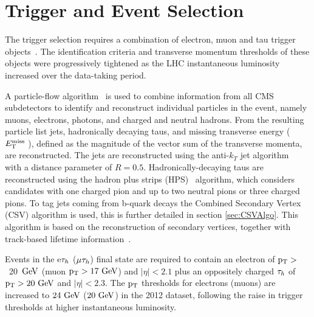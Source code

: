  

\section{Trigger and Event Selection}


The trigger selection requires a combination of electron, muon and tau trigger 
objects~\cite{CMS-PAS-EGM-10-004,CMS-PAS-MUO-10-002,CMS-EWK-TAU}. 
The identification criteria and transverse momentum thresholds of these objects 
were progressively tightened as the LHC instantaneous luminosity increased over the data-taking period.

A particle-flow algorithm~\cite{CMS-PAS-PFT-09-001,CMS-PAS-PFT-10-002,CMS-PAS-PFT-10-003} 
is used to combine information from all CMS subdetectors to identify and reconstruct individual 
particles in the event, namely muons, electrons, photons, and charged and neutral hadrons. 
From the resulting particle list jets, hadronically decaying taus, and missing transverse energy 
($E_\mathrm{T}^{\mathrm{miss}}\;$), defined as the magnitude of the vector sum of the transverse momenta, are reconstructed. 
The jets are reconstructed using the anti-$k_T$ jet algorithm~\cite{Cacciari:fastjet1,Cacciari:fastjet2} 
with a distance parameter of $R=0.5$. Hadronically-decaying taus are reconstructed using the hadron 
plus strips (HPS)~\cite{CMS-PAS-TAU-11-001} algorithm, which considers candidates with one charged 
pion and up to two neutral pions or three charged pions. To tag jets coming from b-quark decays the 
Combined Secondary Vertex (CSV) algorithm is used, this is further detailed in section \ref{sec:CSVAlgo}. 
This algorithm is based on the reconstruction of secondary vertices, together with track-based lifetime 
information~\cite{BTV-11-004}. 

Events in the $\mathrm{e}\mathrm{\tau}_h$ ($\mathrm{\mu}\mathrm{\tau}_h$) final state are required to contain
an electron of $\mathrm{p_{T}} >$~20~$\mathrm{GeV}$ (muon $\mathrm{p_{T}} >17~\mathrm{GeV}$) and $|\eta| < 2.1$ 
plus an oppositely charged $\mathrm{\tau}_h$ of $\mathrm{p_{T}} > 20~\mathrm{GeV}$ and $|\eta| < 2.3$.
The $\mathrm{p_{T}}$ thresholds for electrons (muons) are increased to $24~\mathrm{GeV}$ ($20~\mathrm{GeV}$) in the 2012 dataset,
following the raise in trigger thresholds at higher instantaneous luminosity.
%

